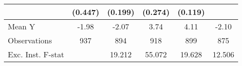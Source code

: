 {\begin{tabular}{l*{5}{c}}
            &     (0.447)         &     (0.199)         &     (0.274)         &     (0.119)         &                     \\
\midrule
Mean Y      &       -1.98         &       -2.07         &        3.74         &        4.11         &       -2.10         \\
Observations&         937         &         894         &         918         &         899         &         875         \\
Exc. Inst. F-stat&                     &      19.212         &      55.072         &      19.628         &      12.506         \\
\bottomrule
\end{tabular}
}
